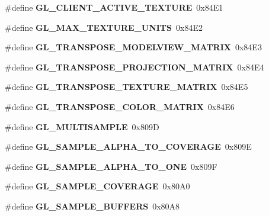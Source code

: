\begin{DoxyCompactItemize}
\item 
\#define {\bfseries G\+L\+\_\+\+C\+L\+I\+E\+N\+T\+\_\+\+A\+C\+T\+I\+V\+E\+\_\+\+T\+E\+X\+T\+U\+R\+E}~0x84\+E1\label{_s_d_l__opengl_8h_af63f4282cc56a189eb80eae77d67b3e0}

\item 
\#define {\bfseries G\+L\+\_\+\+M\+A\+X\+\_\+\+T\+E\+X\+T\+U\+R\+E\+\_\+\+U\+N\+I\+T\+S}~0x84\+E2\label{_s_d_l__opengl_8h_a8f6ece15f415fdb5e36304c8f97ca6e5}

\item 
\#define {\bfseries G\+L\+\_\+\+T\+R\+A\+N\+S\+P\+O\+S\+E\+\_\+\+M\+O\+D\+E\+L\+V\+I\+E\+W\+\_\+\+M\+A\+T\+R\+I\+X}~0x84\+E3\label{_s_d_l__opengl_8h_a0c34ffa53a0274d9c166bdc4df2acc74}

\item 
\#define {\bfseries G\+L\+\_\+\+T\+R\+A\+N\+S\+P\+O\+S\+E\+\_\+\+P\+R\+O\+J\+E\+C\+T\+I\+O\+N\+\_\+\+M\+A\+T\+R\+I\+X}~0x84\+E4\label{_s_d_l__opengl_8h_a19b1e353ea3faed6b89763c5915671ff}

\item 
\#define {\bfseries G\+L\+\_\+\+T\+R\+A\+N\+S\+P\+O\+S\+E\+\_\+\+T\+E\+X\+T\+U\+R\+E\+\_\+\+M\+A\+T\+R\+I\+X}~0x84\+E5\label{_s_d_l__opengl_8h_aad823388048763dc1fdbaef3ee1b8fa6}

\item 
\#define {\bfseries G\+L\+\_\+\+T\+R\+A\+N\+S\+P\+O\+S\+E\+\_\+\+C\+O\+L\+O\+R\+\_\+\+M\+A\+T\+R\+I\+X}~0x84\+E6\label{_s_d_l__opengl_8h_a7454c4fee21755ef1d20da95542c6961}

\item 
\#define {\bfseries G\+L\+\_\+\+M\+U\+L\+T\+I\+S\+A\+M\+P\+L\+E}~0x809\+D\label{_s_d_l__opengl_8h_aa2b6486ff7ecee8bf04e3371f197527a}

\item 
\#define {\bfseries G\+L\+\_\+\+S\+A\+M\+P\+L\+E\+\_\+\+A\+L\+P\+H\+A\+\_\+\+T\+O\+\_\+\+C\+O\+V\+E\+R\+A\+G\+E}~0x809\+E\label{_s_d_l__opengl_8h_a974e3d03b26a60757018116abc99455f}

\item 
\#define {\bfseries G\+L\+\_\+\+S\+A\+M\+P\+L\+E\+\_\+\+A\+L\+P\+H\+A\+\_\+\+T\+O\+\_\+\+O\+N\+E}~0x809\+F\label{_s_d_l__opengl_8h_a5c64c1196bf55d6676a28e219298ac38}

\item 
\#define {\bfseries G\+L\+\_\+\+S\+A\+M\+P\+L\+E\+\_\+\+C\+O\+V\+E\+R\+A\+G\+E}~0x80\+A0\label{_s_d_l__opengl_8h_a28521a0c7005cfc7ada652c82cba801d}

\item 
\#define {\bfseries G\+L\+\_\+\+S\+A\+M\+P\+L\+E\+\_\+\+B\+U\+F\+F\+E\+R\+S}~0x80\+A8\label{_s_d_l__opengl_8h_a826c1addfb8459689d3268cd592ebe3c}


\end{DoxyCompactItemize}
